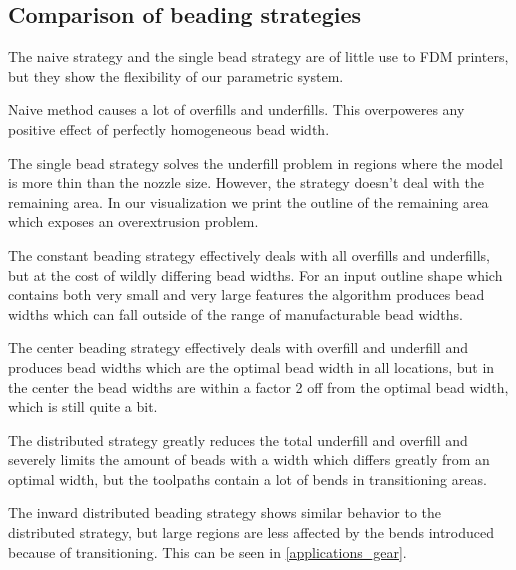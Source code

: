 \subsection{Comparison of beading strategies}

The naive strategy and the single bead strategy are of little use to FDM printers, but they show the flexibility of our parametric system.

Naive method causes a lot of overfills and underfills.
This overpoweres any positive effect of perfectly homogeneous bead width.

The single bead strategy solves the underfill problem in regions where the model is more thin than the nozzle size.
However, the strategy doesn't deal with the remaining area.
In our visualization we print the outline of the remaining area which exposes an overextrusion problem.

The constant beading strategy effectively deals with all overfills and underfills, but at the cost of wildly differing bead widths.
For an input outline shape which contains both very small and very large features the algorithm produces bead widths which can fall outside of the range of manufacturable bead widths.

The center beading strategy effectively deals with overfill and underfill and produces bead widths which are the optimal bead width in all locations, but in the center the bead widths are within a factor 2 off from the optimal bead width, which is still quite a bit.

The distributed strategy greatly reduces the total underfill and overfill and severely limits the amount of beads with a width which differs greatly from an optimal width, but the toolpaths contain a lot of bends in transitioning areas.

The inward distributed beading strategy shows similar behavior to the distributed strategy, but large regions are less affected by the bends introduced because of transitioning.
This can be seen in \cref{applications_gear}.







